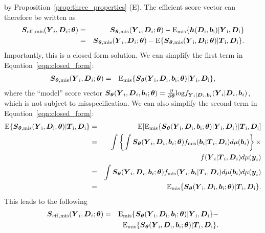 \documentclass[12pt]{article}
\def\log{\hbox{log}}
\def\bse{\begin{eqnarray*}}
\def\ese{\end{eqnarray*}}
\def\be{\begin{eqnarray}}
\def\ee{\end{eqnarray}}
\def\bse{\begin{eqnarray*}}
\def\ese{\end{eqnarray*}}
\def\bS{{\mathbf S}}
\def\bzero{{\mathbf 0}}
\def\btheta{{\boldsymbol{\theta}}}
\def\bzero{{\boldsymbol{0}}}
\def\bb{{\boldsymbol b}}
\def\bh{{\boldsymbol h}}
\def\by{{\boldsymbol y}}
\def\bD{{\boldsymbol D}}
\def\bS{{\boldsymbol S}}
\def\bT{{\boldsymbol T}}
\def\bY{{\boldsymbol Y}}
\def\tilD{\bD}
\def\E{\rm E}
\begin{document}
by Proposition~\ref{prop:three_properties} (E). The efficient score vector can therefore be written as
\be
\bS_{\rm eff,mis}(\bY_i,\tilD_i;\btheta)&=&
\bS_{\btheta, \rm{mis}}(\bY_i,\tilD_i;\btheta)-\E_{\rm{mis}}\{\bh(\tilD_i,\bb_i)|\bY_i,\tilD_i\}\nonumber\\
&=&\bS_{\btheta, \rm{mis}}(\bY_i,\tilD_i;\btheta)-\E\{\bS_{\btheta, \rm{mis}}(\bY_i,\tilD_i;\btheta)|\bT_i,\tilD_i\}\label{eqn:closed_form}.
\ee
Importantly, this is a closed form solution. We can simplify the first term in Equation~\eqref{eqn:closed_form}: %
\bse
\bS_{\btheta, \rm{mis}}(\bY_i,\tilD_i;\btheta)&=&\E_{\rm{mis}}\{\bS_{\btheta}(\bY_i,\tilD_i,\bb_i;\btheta)|\bY_i,\tilD_i\},
\ese
where the ``model'' score vector $\bS_{\btheta}(\bY_i,\tilD_i,\bb_i;\btheta)=\frac{\partial}{\partial\btheta} \log f_{\bY_i|\tilD_i,\bb_i}(\bY_i|\tilD_i,\bb_i)$, which is not subject to misspecification. We can also simplify the second term in Equation~\eqref{eqn:closed_form}:
\bse
\E\{\bS_{\btheta, \rm{mis}}(\bY_i,\tilD_i;\btheta)|\bT_i,\tilD_i\}&=&\E[\E_{\rm{mis}}\{\bS_{\btheta}(\bY_i,\tilD_i,\bb_i;\btheta)|\bY_i,\tilD_i\}|\bT_i,\tilD_i]\\
&=&\int \left\{\int \bS_{\btheta}(\bY_i,\tilD_i,\bb_i;\btheta)f_{\rm{mis}}(\bb_i|\bT_i,\tilD_i)d\mu(\bb_i)\right\} \times \\
&& f(\bY_i|\bT_i,\tilD_i) d\mu(\by_i)\\
&=&\int \bS_{\btheta}(\bY_i,\tilD_i,\bb_i;\btheta)f_{\rm{mis}}(\bY_i,\bb_i|\bT_i,\tilD_i)d\mu(\bb_i)d\mu(\by_i)\\
&=&\E_{\rm{mis}}\{\bS_{\btheta}(\bY_i,\tilD_i,\bb_i;\btheta)|\bT_i,\tilD_i\}.
\ese
This leads to the following
\bse
\bS_{\rm eff, mis}(\bY_i,\tilD_i;\btheta)&=&\E_{\rm{mis}}\{\bS_{\btheta}(\bY_i,\tilD_i,\bb_i;\btheta)|\bY_i,\tilD_i\}-\\
&&\E_{\rm{mis}}\{\bS_{\btheta}(\bY_i,\tilD_i,\bb_i;\btheta)|\bT_i,\tilD_i\}.
\ese
\end{document}

